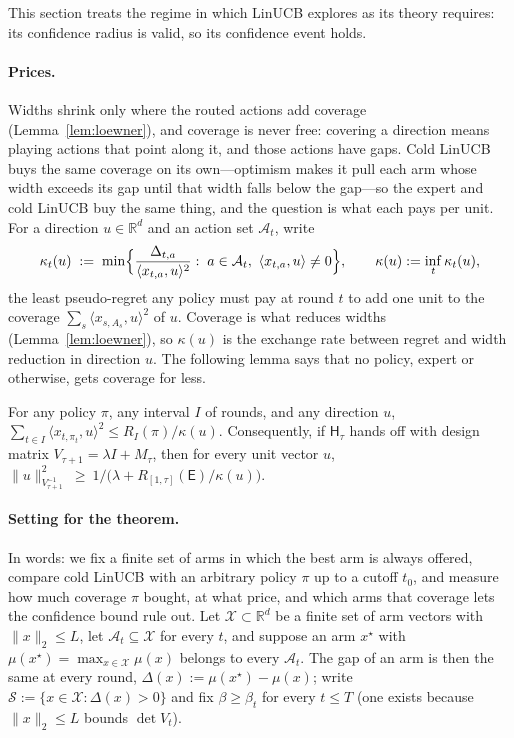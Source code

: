 \documentclass[anon]{alt2027} %
\newcommand{\R}{\mathbb{R}}
\newcommand{\Exp}{\mathsf{E}}
\newcommand{\Hyb}{\mathsf{H}}
\begin{document}
This section treats the regime in which LinUCB explores as its theory
requires: its confidence radius is valid, so its confidence event holds.

\paragraph{Prices.}
Widths shrink only where the routed actions add coverage
(Lemma~\ref{lem:loewner}), and coverage is never free: covering a direction
means playing actions that point along it, and those actions have gaps. Cold
LinUCB buys the same coverage on its own---optimism makes it pull each arm
whose width exceeds its gap until that width falls below the gap---so the
expert and cold LinUCB buy the same thing, and the question is what each pays
per unit. For a direction $u\in\R^d$ and an action set $\mathcal A_t$, write
\begin{equation}
\label{eq:price}
\kappa_t(u)\;:=\;\min\Bigl\{\frac{\Delta_{t,a}}{\langle x_{t,a},u\rangle^2}:\;a\in\mathcal A_t,\ \langle x_{t,a},u\rangle\neq0\Bigr\},
\qquad \kappa(u):=\inf_t\kappa_t(u),
\end{equation}
the least pseudo-regret any policy must pay at round $t$ to add one unit to
the coverage $\sum_s\langle x_{s,A_s},u\rangle^2$ of $u$. Coverage is what
reduces widths (Lemma~\ref{lem:loewner}), so $\kappa(u)$ is the exchange rate
between regret and width reduction in direction $u$. The following lemma
says that no policy, expert or otherwise, gets coverage for less.

\begin{lemma}
\label{lem:no-free-coverage}
For any policy $\pi$, any interval $I$ of rounds, and any direction $u$,
$\sum_{t\in I}\langle x_{t,\pi_t},u\rangle^2\le R_I(\pi)/\kappa(u)$.
Consequently, if $\Hyb_\tau$ hands off with design matrix $V_{\tau+1}=\lambda I+M_\tau$, then
for every unit vector $u$,
$\|u\|^2_{V_{\tau+1}^{-1}}\ \ge\ 1\big/\bigl(\lambda+R_{[1,\tau]}(\Exp)/\kappa(u)\bigr)$.
\end{lemma}


\paragraph{Setting for the theorem.}
In words: we fix a finite set of arms in which the best arm is always
offered, compare cold LinUCB with an arbitrary policy $\pi$ up to a cutoff
$t_0$, and measure how much coverage $\pi$ bought, at what price, and which
arms that coverage lets the confidence bound rule out. Let
$\mathcal X\subset\R^d$ be a finite set of arm vectors with $\|x\|_2\le L$,
let $\mathcal A_t\subseteq\mathcal X$ for every $t$, and suppose an arm
$x^\star$ with $\mu(x^\star)=\max_{x\in\mathcal X}\mu(x)$ belongs to every
$\mathcal A_t$. The gap of an arm is then the same at every round,
$\Delta(x):=\mu(x^\star)-\mu(x)$; write $\mathcal S:=\{x\in\mathcal X:\Delta(x)>0\}$
and fix $\beta\ge\beta_t$ for every $t\le T$ (one exists because
$\|x\|_2\le L$ bounds $\det V_t$).
\end{document}
